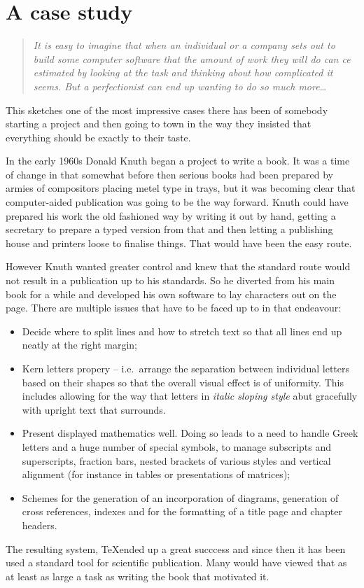 \section{A case study}
\begin{quotation}\textit{
It is easy to imagine that when an individual or a company sets out to
build some computer software that the amount of work they will do can
ce estimated by looking at the task and thinking about how complicated
it seems. But a perfectionist can end up wanting to do so much more\ldots
}\end{quotation}
This sketches one of the most impressive cases there has been of somebody
starting a project and then going to town in the way they insisted
that everything should be exactly to their taste.

In the early 1960s Donald Knuth began a project to write a book. It was a
time of change in that somewhat before then serious books had been prepared
by armies of compositors placing metel type in trays, but it was becoming
clear that computer-aided publication was going to be the way forward. Knuth
could have prepared his work the old fashioned way by writing it out by hand,
getting a secretary to prepare a typed version from that and then letting
a publishing house and printers loose to finalise things. That would have been
the easy route.

However Knuth wanted greater control and knew that the standard route would
not result in a publication up to his standards. So he diverted from
his main book for a while and developed his own software to lay characters
out on the page. There are multiple issues that have to be faced up to in that
endeavour:
\begin{itemize}
\item Decide where to split lines and how to stretch text so that all lines
end up neatly at the right margin;
\item Kern letters propery -- i.e.\ arrange the separation between individual
letters based on their shapes so that the overall visual effect is of
uniformity. This includes allowing for the way that letters in
{\it italic sloping style} abut gracefully with upright text that surrounds.
\item Present displayed mathematics well. Doing so leads to a need to
handle Greek letters and a huge number of special symbols, to manage
subscripts and superscripts, fraction bars, nested brackets of various
styles and vertical alignment (for instance in tables or presentations of
matrices);
\item Schemes for the generation of an incorporation of diagrams,
generation of cross references, indexes and for the formatting of
a title page and chapter headers.
\end{itemize}
The resulting system, \TeX ended up a great succcess and since then it has
been used a standard tool for scientific publication.
Many would have viewed that as at least as large a task as writing the book
that motivated it.

